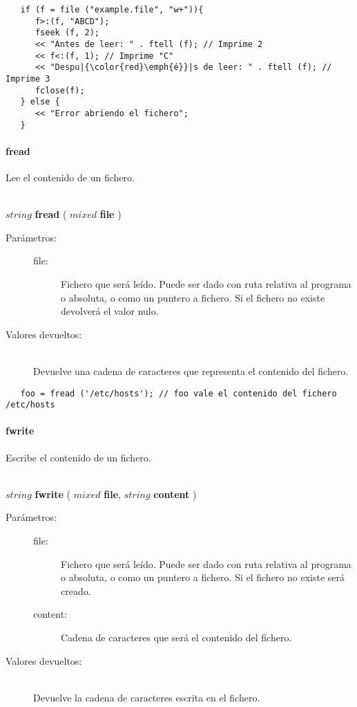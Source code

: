 \begin{lstlisting}  
   if (f = file ("example.file", "w+")){
      f>:(f, "ABCD");
      fseek (f, 2);
      << "Antes de leer: " . ftell (f); // Imprime 2
      << f<:(f, 1); // Imprime "C"
      << "Despu|{\color{red}\emph{é}}|s de leer: " . ftell (f); // Imprime 3
      fclose(f);
   } else {
      << "Error abriendo el fichero";
   }
\end{lstlisting}

\paragraph{fread}
Lee el contenido de un fichero.

\begin{framed}
\hfill \\ $string$ \textbf{fread} ( $mixed$ \textbf{file}  )  
\begin{description}
\item [Parámetros:] \hfill 
   \begin{description}
   \item[file:] Fichero que será leído. Puede ser dado con ruta relativa al programa o absoluta, o como un puntero a fichero. Si el fichero no existe
   devolverá el valor nulo.
   \end{description}
\item[Valores devueltos:] \hfill \\
   Devuelve una cadena de caracteres que representa el contenido del fichero.
\end{description}
\end{framed}

\begin{lstlisting}  
   foo = fread ('/etc/hosts'); // foo vale el contenido del fichero /etc/hosts
\end{lstlisting}

\paragraph{fwrite}
Escribe el contenido de un fichero.

\begin{framed}
\hfill \\ $string$ \textbf{fwrite} ( $mixed$ \textbf{file}, $string$ \textbf{content}  )  
\begin{description}
\item [Parámetros:] \hfill 
   \begin{description}
   \item[file:] Fichero que será leído. Puede ser dado con ruta relativa al programa o absoluta, o como un puntero a fichero. 
   Si el fichero no existe será creado.
   \item[content:] Cadena de caracteres que será el contenido del fichero.
   \end{description}
\item[Valores devueltos:] \hfill \\
   Devuelve la cadena de caracteres escrita en el fichero.
\end{description}
\end{framed}

